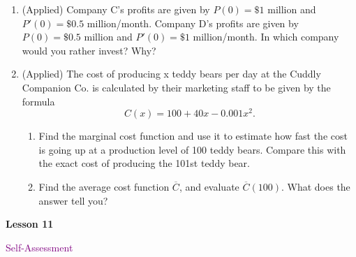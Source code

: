 \documentclass[10pt]{book}
\theoremstyle{definition}
\theoremstyle{remark}
\begin{document}
\begin{large}
\begin{enumerate}
\item (Applied) Company C’s profits are given by $P(0) = \$1$ million and $P'(0) = \$0.5$ million/month. Company D’s profits are given by $P(0) = \$0.5$ million and $P'(0) =    \$1$ million/month. In which company would you rather invest? Why? \vfil
\item (Applied) The cost of producing x teddy bears per day at the Cuddly Companion Co. is calculated by their marketing staff to be given by the formula \[C(x) = 100 + 40x - 0.001x^2.\]
\begin{enumerate}
	\item   Find the marginal cost function and use it to estimate how fast the cost is going up at a production level of 100 teddy bears. Compare this with the exact cost of producing the 101st teddy bear.
	\item  Find the average cost function $\overline{C}$, and evaluate $\overline{C}(100)$.  What does the answer tell you? 
\end{enumerate}
\end{enumerate}
\end{large}
\newpage


\begin{tcolorbox}[
  width=\textwidth,
  colback=gray!10, %
  colframe=white, %
  boxrule=0pt,    %
  left=1cm,       %
  right=1cm,      %
  sharp corners  %
]

\begin{minipage}[t]{0.5\textwidth}
  \Huge \textbf{Lesson 11}
\end{minipage}%
\hfill
\begin{minipage}[t]{0.5\textwidth}
  \Huge\textcolor{purple}{Self-Assessment}
\end{minipage}
\end{tcolorbox}
\end{document}
